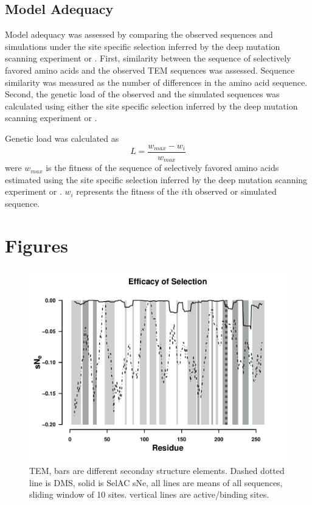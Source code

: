 \documentclass[12pt]{article}
\begin{document}
\subsection*{Model Adequacy}

Model adequacy was assessed by comparing the observed sequences and simulations under the site specific selection inferred by the deep mutation scanning experiment or \selac.
First, similarity between the sequence of selectively favored amino acids and the observed TEM sequences was assessed.
Sequence similarity was measured as the number of differences in the amino acid sequence.
Second, the genetic load of the observed and the simulated sequences was calculated using either the site specific selection inferred by the deep mutation scanning experiment or \selac.

Genetic load was calculated as
\begin{equation}
L = \frac{w_{max} - w_i}{w_{max}}
\end{equation}
were $w_{max}$ is the fitness of the sequence of selectively favored amino acids estimated using  the site specific selection inferred by the deep mutation scanning experiment or \selac.
$w_i$ represents the fitness of the $i$th observed or simulated sequence.




\section*{Figures}

\begin{figure}[H]
     \centering
	\includegraphics[width=\textwidth]{img/sNe_slide_TEM2016}
	\caption{TEM, bars are different seconday structure elements. Dashed dotted line is DMS, solid is SelAC sNe, all lines are means of all sequences, sliding window of 10 sites. vertical lines are active/binding sites.}
	\label{fig:tem2016_sse}
\end{figure}
\end{document}
